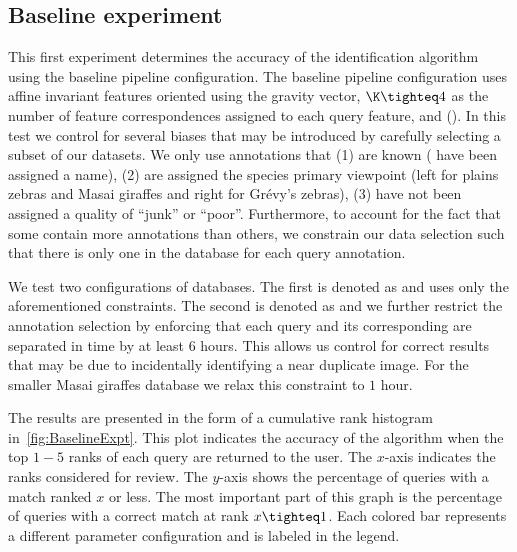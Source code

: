     \subsection{Baseline experiment}\label{sub:exptbase}
      

        This first experiment determines the accuracy of the identification algorithm using the baseline pipeline
          configuration.
        The baseline pipeline configuration uses affine invariant features oriented using the gravity vector,
          $\K\tighteq4$ as the number of feature correspondences assigned to each query feature, and \nscoring{}
          (\nsum{}).
        In this test we control for several biases that may be introduced by carefully selecting a subset of our
          datasets.
        We only use annotations that
        (1) are known (\ie{} have been assigned a name),
        (2) are assigned the species primary viewpoint (left for plains zebras and Masai giraffes and right for
          Grévy's zebras),
        (3) have not been assigned a quality of ``junk'' or ``poor''.
        Furthermore, to account for the fact that some \names{} contain more annotations than others, we
          constrain our data selection such that there is only one \groundtrue{} \exemplar{} in the database for
          each query annotation.

        We test two configurations of databases.
        The first is denoted as \ctrl{} and uses only the aforementioned constraints.
        The second is denoted as \timectrl{} and we further restrict the annotation selection by enforcing that
          each query and its corresponding \groundtrue{} \exemplar{} are separated in time by at least $6$ hours.
        This allows us control for correct results that may be due to incidentally identifying a near duplicate
          image.
        For the smaller Masai giraffes database we relax this constraint to $1$ hour.

        The results are presented in the form of a cumulative rank histogram in~\cref{fig:BaselineExpt}.
        This plot indicates the accuracy of the algorithm when the top $1-5$ ranks of each query are returned to
          the user.
        The $x$-axis indicates the ranks considered for review.
        The $y$-axis shows the percentage of queries with a \groundtrue{} match ranked $x$ or less.
        The most important part of this graph is the percentage of queries with a correct match at rank
          $x\tighteq1$.
        Each colored bar represents a different parameter configuration and is labeled in the legend.

